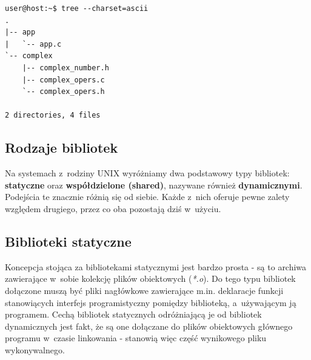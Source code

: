 \begin{lstlisting}[language=Cmd, caption={Struktura katalogów projektu stanowiącego bazę przykładu dotyczącego bibliotek.},label={lst:libexample}]
user@host:~$ tree --charset=ascii
.
|-- app
|   `-- app.c
`-- complex
    |-- complex_number.h
    |-- complex_opers.c
    `-- complex_opers.h

2 directories, 4 files
\end{lstlisting}


\subsection{Rodzaje bibliotek}
Na systemach z~rodziny UNIX wyróżniamy dwa podstawowy typy bibliotek: \textbf{statyczne} oraz \textbf{współdzielone (shared)}, nazywane również \textbf{dynamicznymi}. Podejścia te znacznie różnią się od siebie. Każde z~nich oferuje pewne zalety względem drugiego, przez co oba pozostają dziś w~użyciu.



\subsection{Biblioteki statyczne}
Koncepcja stojąca za bibliotekami statycznymi jest bardzo prosta \cite{Compiling} - są to archiwa zawierające w~sobie kolekcję plików obiektowych (\textit{*.o}). Do tego typu bibliotek dołączone muszą być pliki nagłówkowe zawierające m.in. deklaracje funkcji stanowiących interfejs programistyczny pomiędzy biblioteką, a~używającym ją programem. Cechą bibliotek statycznych odróżniającą je od bibliotek dynamicznych jest fakt, że są one dołączane do plików obiektowych głównego programu w~czasie linkowania - stanowią więc część wynikowego pliku wykonywalnego. 



